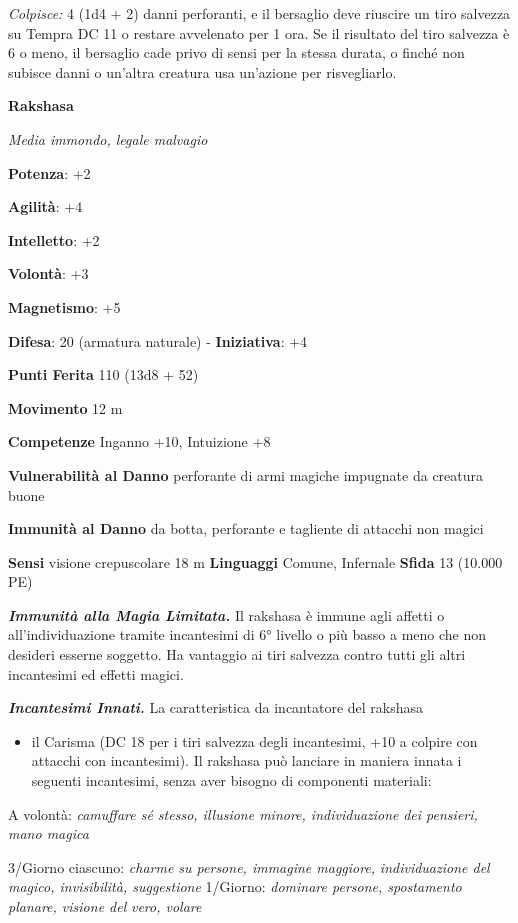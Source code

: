 \begin{multicols}{2}
\emph{Colpisce:} 4 (1d4 + 2) danni perforanti, e il bersaglio deve
riuscire un tiro salvezza su Tempra DC 11 o restare avvelenato per
1 ora. Se il risultato del tiro salvezza è 6 o meno, il bersaglio cade
privo di sensi per la stessa durata, o finché non subisce danni o
un'altra creatura usa un'azione per risvegliarlo.


\textbf{Rakshasa}

\emph{Media immondo, legale malvagio}

\textbf{Potenza}: +2

\textbf{Agilità}: +4

\textbf{Intelletto}: +2

\textbf{Volontà}: +3

\textbf{Magnetismo}: +5

\textbf{Difesa}: 20 (armatura naturale) - \textbf{Iniziativa}: +4

\textbf{Punti Ferita} 110 (13d8 + 52)

\textbf{Movimento} 12 m

\textbf{Competenze} Inganno +10, Intuizione +8

\textbf{Vulnerabilità al Danno} perforante di armi magiche impugnate da
creatura buone

\textbf{Immunità al Danno} da botta, perforante e tagliente di
attacchi non magici

\textbf{Sensi} visione crepuscolare 18 m
\textbf{Linguaggi} Comune, Infernale \textbf{Sfida} 13 (10.000 PE)\smallskip

\emph{\textbf{Immunità alla Magia Limitata.}} Il rakshasa è immune agli
affetti o all'individuazione tramite incantesimi di 6° livello o più
basso a meno che non desideri esserne soggetto. Ha vantaggio ai tiri
salvezza contro tutti gli altri incantesimi ed effetti magici.

\emph{\textbf{Incantesimi Innati.}} La caratteristica da incantatore del
rakshasa


\begin{itemize}
\item
  il Carisma (DC 18 per i tiri salvezza degli incantesimi, +10 a colpire
  con attacchi con incantesimi). Il rakshasa può lanciare in maniera
  innata i seguenti incantesimi, senza aver bisogno di componenti
  materiali:
\end{itemize}


A volontà: \emph{camuffare sé stesso, illusione minore, individuazione}
\emph{dei pensieri, mano magica}

3/Giorno ciascuno: \emph{charme su persone, immagine maggiore,}
\emph{individuazione del magico, invisibilità, suggestione} 1/Giorno:
\emph{dominare persone, spostamento planare, visione del} \emph{vero,
volare}


\end{multicols}
